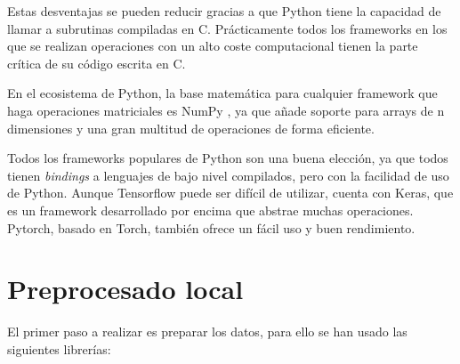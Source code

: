 Estas desventajas se pueden reducir gracias a que Python tiene la capacidad de llamar a subrutinas compiladas en C. Prácticamente todos los frameworks en los que se realizan operaciones con un alto coste computacional tienen la parte crítica de su código escrita en C.

En el ecosistema de Python, la base matemática para cualquier framework que haga operaciones matriciales es NumPy \cite{VanDerWalt2011}, ya que añade soporte para arrays de n dimensiones y una gran multitud de operaciones de forma eficiente.

Todos los frameworks populares de Python son una buena elección, ya que todos tienen \textit{bindings} a lenguajes de bajo nivel compilados, pero con la facilidad de uso de Python. Aunque Tensorflow puede ser difícil de utilizar, cuenta con Keras, que es un framework desarrollado por encima que abstrae muchas operaciones. Pytorch, basado en Torch, también ofrece un fácil uso y buen rendimiento.

\section{Preprocesado local}\label{sec:local_preprocessing}

El primer paso a realizar es preparar los datos, para ello se han usado las siguientes librerías:

